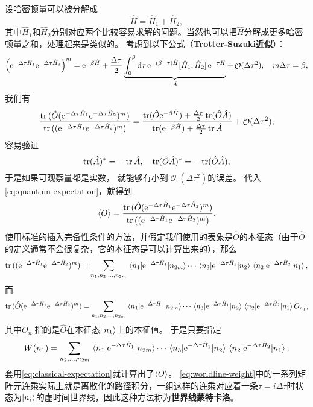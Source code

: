 \documentclass[hyperref, UTF8, a4paper]{ctexart}
\newcommand*{\ee}{\mathrm{e}}
\DeclareMathOperator{\bigO}{\mathcal{O}}
\newcommand*{\concept}[1]{{\textbf{#1}}}
\begin{document}
设哈密顿量可以被分解成
\begin{equation}
    \hat{H} = \hat{H}_1 + \hat{H}_2,
\end{equation}
其中$\hat{H}_1$和$\hat{H}_2$分别对应两个比较容易求解的问题。当然也可以把$\hat{H}$分解成更多哈密顿量之和，处理起来是类似的。
考虑到以下公式（\concept{Trotter-Suzuki近似}）：
\begin{equation}
    \left( \ee^{-\Delta \tau \hat{H}_1} \ee^{- \Delta \tau \hat{H}_2} \right)^m = \ee^{-\beta \hat{H}} + \frac{\Delta \tau}{2} \underbrace{\int_0^\beta \dd{\tau} \ee^{-(\beta-\tau) \hat{H}} \comm*{\hat{H}_1}{\hat{H}_2} \ee^{-\tau \hat{H}}}_{\hat{A}} + \bigO(\Delta \tau^2), \quad m \Delta \tau = \beta,
\end{equation}
我们有
\[
    \frac{\trace{(\hat{O} ( \ee^{-\Delta \tau \hat{H}_1} \ee^{- \Delta \tau \hat{H}_2} )^m)}}{\trace{(( \ee^{-\Delta \tau \hat{H}_1} \ee^{- \Delta \tau \hat{H}_2} )^m)}} = \frac{\trace(\hat{O} \ee^{-\beta \hat{H}}) + \frac{\Delta \tau}{2} \trace(\hat{O} \hat{A})}{\trace(\ee^{-\beta \hat{H}}) + \frac{\Delta \tau}{2} \trace\hat{A}} + \bigO(\Delta \tau^2),
\]
容易验证
\[
    \trace(\hat{A})^* = - \trace \hat{A}, \quad \trace(\hat{O} \hat{A})^* = - \trace(\hat{O} \hat{A}),
\]
于是如果可观察量都是实数，%
就能够有小到$\bigO(\Delta \tau^2)$的误差。
代入\eqref{eq:quantum-expectation}，就得到
\[
    \expval{O} = \frac{\trace{(\hat{O} ( \ee^{-\Delta \tau \hat{H}_1} \ee^{- \Delta \tau \hat{H}_2} )^m)}}{\trace{(( \ee^{-\Delta \tau \hat{H}_1} \ee^{- \Delta \tau \hat{H}_2} )^m)}}.
\]
使用标准的插入完备性条件的方法，并假定我们使用的表象是$\hat{O}$的本征态（由于$\hat{O}$的定义通常不会很复杂，它的本征态是可以计算出来的），那么
\[
    \trace{(( \ee^{-\Delta \tau \hat{H}_1} \ee^{- \Delta \tau \hat{H}_2} )^m)} = \sum_{n_1, n_2, \ldots, n_{2m}} \mel{n_1}{\ee^{-\Delta \tau \hat{H}_1}}{n_{2m}} \cdots \mel{n_3}{\ee^{-\Delta \tau \hat{H}_1}}{n_2} \mel{n_2}{\ee^{-\Delta \tau \hat{H}_2}}{n_1},
\]
而
\[
    \trace{(\hat{O} ( \ee^{-\Delta \tau \hat{H}_1} \ee^{- \Delta \tau \hat{H}_2} )^m)} = \sum_{n_1, n_2, \ldots, n_{2m}} \mel{n_1}{\ee^{-\Delta \tau \hat{H}_1}}{n_{2m}} \cdots \mel{n_3}{\ee^{-\Delta \tau \hat{H}_1}}{n_2} \mel{n_2}{\ee^{-\Delta \tau \hat{H}_2}}{n_1} O_{n_1},
\]
其中$O_{n_1}$指的是$\hat{O}$在本征态$\ket*{n_1}$上的本征值。
于是只要指定
\begin{equation}
    W(n_1) = \sum_{n_2, \ldots, n_{2m}} \mel{n_1}{\ee^{-\Delta \tau \hat{H}_1}}{n_{2m}} \cdots \mel{n_3}{\ee^{-\Delta \tau \hat{H}_1}}{n_2} \mel{n_2}{\ee^{-\Delta \tau \hat{H}_2}}{n_1},
    \label{eq:worldline-weight}
\end{equation}
套用\eqref{eq:classical-expectation}就计算出了$\expval{O}$。
\eqref{eq:worldline-weight}中的一系列矩阵元连乘实际上就是离散化的路径积分，一组这样的连乘对应着一条$\tau=i \Delta \tau$时状态为$\ket{n_i}$的虚时间世界线，因此这种方法称为\concept{世界线蒙特卡洛}。
\end{document}
